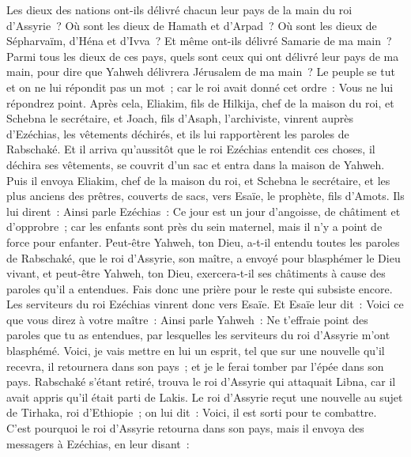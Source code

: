 \begin{multicols}{2}
Les dieux des nations ont-ils délivré chacun leur pays de la main du roi d'Assyrie~?
Où sont les dieux de Hamath et d'Arpad~? Où sont les dieux de Sépharvaïm, d'Héna et d'Ivva~? Et même ont-ils délivré Samarie de ma main~?
Parmi tous les dieux de ces pays, quels sont ceux qui ont délivré leur pays de ma main, pour dire que Yahweh délivrera Jérusalem de ma main~?
Le peuple se tut et on ne lui répondit pas un mot~; car le roi avait donné cet ordre~: Vous ne lui répondrez point.
Après cela, Eliakim, fils de Hilkija, chef de la maison du roi, et Schebna le secrétaire, et Joach, fils d'Asaph, l'archiviste, vinrent auprès d'Ezéchias, les vêtements déchirés, et ils lui rapportèrent les paroles de Rabschaké.
\VerseOne{}Et il arriva qu'aussitôt que le roi Ezéchias entendit ces choses, il déchira ses vêtements, se couvrit d'un sac et entra dans la maison de Yahweh.
Puis il envoya Eliakim, chef de la maison du roi, et Schebna le secrétaire, et les plus anciens des prêtres, couverts de sacs, vers Esaïe, le prophète, fils d'Amots.
Ils lui dirent~: Ainsi parle Ezéchias~: Ce jour est un jour d'angoisse, de châtiment et d'opprobre~; car les enfants sont près du sein maternel, mais il n'y a point de force pour enfanter.
Peut-être Yahweh, ton Dieu, a-t-il entendu toutes les paroles de Rabschaké, que le roi d'Assyrie, son maître, a envoyé pour blasphémer le Dieu vivant, et peut-être Yahweh, ton Dieu, exercera-t-il ses châtiments à cause des paroles qu'il a entendues. Fais donc une prière pour le reste qui subsiste encore.
Les serviteurs du roi Ezéchias vinrent donc vers Esaïe.
Et Esaïe leur dit~: Voici ce que vous direz à votre maître~: Ainsi parle Yahweh~: Ne t'effraie point des paroles que tu as entendues, par lesquelles les serviteurs du roi d'Assyrie m'ont blasphémé.
Voici, je vais mettre en lui un esprit, tel que sur une nouvelle qu'il recevra, il retournera dans son pays~; et je le ferai tomber par l'épée dans son pays.
Rabschaké s'étant retiré, trouva le roi d'Assyrie qui attaquait Libna, car il avait appris qu'il était parti de Lakis.
Le roi d'Assyrie reçut une nouvelle au sujet de Tirhaka, roi d'Ethiopie~; on lui dit~: Voici, il est sorti pour te combattre. C'est pourquoi le roi d'Assyrie retourna dans son pays, mais il envoya des messagers à Ezéchias, en leur disant~:

\end{multicols}
